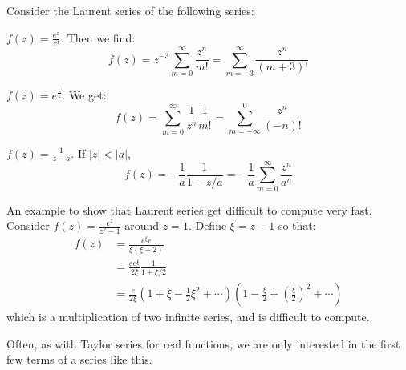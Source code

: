 \documentclass[../Main.tex]{subfiles}
\begin{document}
\begin{examples}{
        Consider the Laurent series of the following series:
    }
    \item $f(z) = \frac{e^z}{z^3}$. Then we find:
        \begin{equation*}
            f(z) = z^{-3}\sum_{m=0}^{\infty} \frac{z^n}{m!} = \sum_{m=-3}^{\infty} \frac{z^n}{(m+3)!}
        \end{equation*}
    \item $f(z) = e^{\frac1z}$. We get:
        \begin{equation*}
            f(z) = \sum_{m=0}^{\infty} \frac{1}{z^n} \frac{1}{m!} = \sum_{m=-\infty}^{0} \frac{z^n}{(-n)!}
        \end{equation*}
    \item $f(z) = \frac1{z-a}$. If $|z| < |a|$,
        \begin{equation*}
            f(z) = -\frac{1}{a} \frac{1}{1 - z / a} = -\frac{1}{a} \sum_{m=0}^{\infty} \frac{z^n}{a^n}
        \end{equation*}
    \item An example to show that Laurent series get difficult to compute very fast.
        Consider $f(z) = \frac{e^z}{z^2 - 1}$ around $z = 1$. Define $\xi = z - 1$ so that:
        \begin{align*}
            f(z) &= \frac{e^\xi e}{\xi(\xi +2)} \\
            &= \frac{e e^\xi}{2\xi} \frac{1}{1 + \xi / 2} \\
            &= \frac{e}{2\xi} \left(1 + \xi - \frac12 \xi^2 + \cdots\right)\left(1 - \frac{\xi}{2} + \left(\frac{\xi}{2}\right)^2 + \cdots\right)
        \end{align*}
        which is a multiplication of two infinite series, and is difficult to compute.
\end{examples}
\begin{remark}
    Often, as with Taylor series for real functions, we are only interested in the first few terms of a series like this.
\end{remark}
\end{document}
